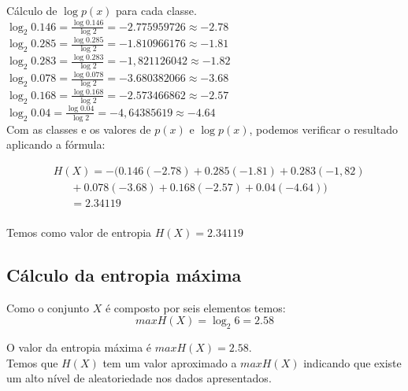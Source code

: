 \documentclass[12pt, a4paper]{article}
\begin{document}
\newline
\par Cálculo de $\log p(x)$ para cada classe. \\

\newline
$\log_2 0.146 = \frac{\log 0.146}{\log 2} = −2.775959726 \approx -2.78$ \\

$\log_2 0.285 = \frac{\log 0.285}{\log 2} = −1.810966176 \approx -1.81$ \\

$\log_2 0.283 = \frac{\log 0.283}{\log 2} = −1,821126042 \approx -1.82$ \\

$\log_2 0.078 = \frac{\log 0.078}{\log 2} = −3.680382066 \approx -3.68$ \\

$\log_2 0.168 = \frac{\log 0.168}{\log 2} = −2.573466862 \approx -2.57$ \\

$\log_2 0.04 = \frac{\log 0.04}{\log 2} = −4,64385619 \approx -4.64$ \\

Com as classes e os valores de $p(x)$ e $\log p(x)$, podemos verificar o resultado aplicando a fórmula:

$$
\begin{align*}
& H(X) = - (  0.146(−2.78) + 0.285(−1.81) + 0.283(−1,82) \\
& \ ~\ ~\ ~\ + 0.078(-3.68) + 0.168(-2.57) + 0.04(-4.64)) \\
& \ ~\ ~\ ~\  = 2.34119 \\
\end{align*}
$$

Temos como valor de entropia $H(X) = 2.34119$

\subsection{Cálculo da entropia máxima}
Como o conjunto $X$ é composto por seis elementos temos:
$$
maxH(X) = \log_2 6 = 2.58
$$

O valor da entropia máxima é $maxH(X) = 2.58$. \\

Temos que $H(X)$ tem um valor aproximado a $maxH(X)$ indicando que existe um alto nível de aleatoriedade nos dados apresentados.
\end{document}
